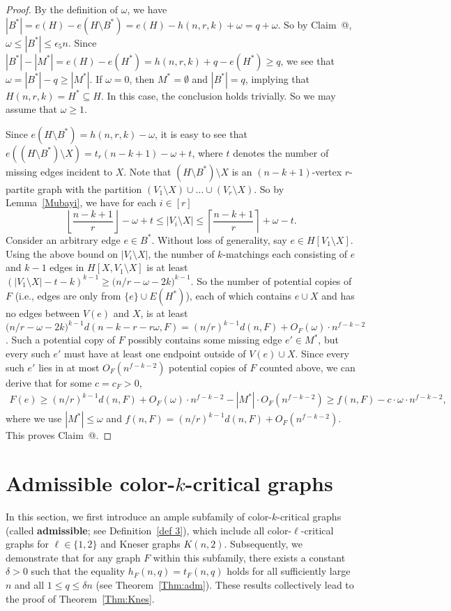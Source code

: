 \documentclass[10pt]{article}
\makeatletter
\newcommand*{\rom}[1]{\expandafter\@slowromancap\romannumeral #1@}
\makeatother
\begin{document}
\begin{proof}
By the definition of $\omega$, we have $|B^\ast|= e(H)-e(H\setminus B^\ast)=e(H)-h(n,r,k)+\omega=q+\omega$.
So by Claim~\rom{2}, $\omega\leq |B^*|\leq \epsilon_5 n$.
Since $|B^*|-|M^*|=e(H)-e(H^*)=h(n,r,k)+q-e(H^*)\geq q$,
we see that $\omega=|B^\ast| -q \geq |M^\ast|$.
If $\omega=0$, then $M^*=\emptyset$ and $|B^*|=q$,
implying that $H(n,r,k)=H^*\subseteq H$.
In this case, the conclusion holds trivially.
So we may assume that $\omega\geq 1$.

Since $e(H\setminus B^\ast)=h(n,r,k)-\omega$,
it is easy to see that $e((H\setminus B^\ast)\setminus X)=t_r(n-k+1)-\omega+t$, where $t$ denotes the number of missing edges incident to $X$.
Note that $(H\setminus B^\ast)\setminus X$ is an $(n-k+1)$-vertex $r$-partite graph with the partition $(V_1\setminus X)\cup \ldots \cup (V_r\setminus X)$.
So by Lemma~\ref{Mubayi}, we have for each $i\in [r]$
\begin{equation*}\label{Sizes of V_i}
\left\lfloor\frac{n-k+1}{r}\right\rfloor-\omega+t\leq |V_i\setminus X|\leq \left\lceil\frac{n-k+1}{r}\right\rceil+\omega-t.
\end{equation*}
Consider an arbitrary edge $e\in B^\ast$. Without loss of generality, say $e\in H[V_1\setminus X]$.
Using the above bound on $|V_i\setminus X|$, the number of $k$-matchings each consisting of $e$ and $k-1$ edges in $H[X,V_1\setminus X]$ is at least $(|V_1\setminus X|-t-k)^{k-1}\geq \big(n/r-\omega-2k\big)^{k-1}$.
So the number of potential copies of $F$ (i.e., edges are only from $\{e\}\cup E(H^*)$),
each of which contains $e\cup X$ and has no edges between $V(e)$ and $X$, is at least $\big(n/r-\omega-2k\big)^{k-1}d(n-k-r-r\omega,F)=(n/r)^{k-1}d(n,F)+O_F(\omega)\cdot n^{f-k-2}$.
Such a potential copy of $F$ possibly contains some missing edge $e'\in M^*$, but every such $e'$ must have at least one endpoint outside of $V(e)\cup X$.
Since every such $e'$ lies in at most $O_F(n^{f-k-2})$ potential copies of $F$ counted above, we can derive that for some $c=c_F>0$,
\begin{align*}
F(e)\geq (n/r)^{k-1}d(n,F)+O_F(\omega)\cdot n^{f-k-2}- |M^*|\cdot O_F(n^{f-k-2})\geq f(n,F)- c\cdot \omega\cdot n^{f-k-2},
\end{align*}
where we use $|M^*|\leq \omega$ and $f(n,F)=(n/r)^{k-1}d(n,F)+O_F(n^{f-k-2})$. This proves Claim~\rom{3}.
\end{proof}


\section{Admissible color-$k$-critical graphs}\label{Section:proof of theorem 1.6}
In this section, we first introduce an ample subfamily of color-$k$-critical graphs (called {\bf admissible}; see Definition~\ref{def 3}),
which include all color-$\ell$-critical graphs for $\ell\in \{1,2\}$ and Kneser graphs $K(n,2)$.
Subsequently, we demonstrate that for any graph $F$ within this subfamily, there exists a constant $\delta>0$ such that the equality $h_F(n,q)=t_F(n,q)$ holds for all sufficiently large $n$ and all $1\leq q\leq \delta n$ (see Theorem~\ref{Thm:adm}).
These results collectively lead to the proof of Theorem~\ref{Thm:Knes}.
\end{document}
